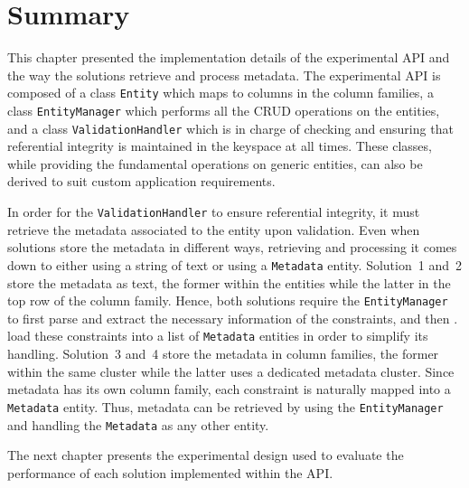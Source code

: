 

% 
% 
% 
% 
%  
% 
%   

\section{Summary}\label{s:Implementation-summary}

This chapter presented the implementation details of the experimental \ac{API}
and the way the solutions retrieve and process metadata. The experimental
\ac{API} is composed of a class \texttt{Entity} which maps to columns in the
column families, a class \texttt{EntityManager} which  performs all the
\ac{CRUD} operations on the entities, and a class \texttt{ValidationHandler}
which is in charge of checking and ensuring that referential integrity is
maintained in the keyspace at all times. These classes, while providing the fundamental
operations on generic entities, can also be derived to suit custom
application requirements. 

In order for the \texttt{ValidationHandler} to ensure referential integrity, it
must retrieve the metadata associated to the entity upon validation.  Even when
solutions store the metadata in different ways, retrieving and processing it comes down to  either using a string of text or
using a \texttt{Metadata} entity.
Solution~1 and~2 store the  metadata as text, the former  within the
entities while the latter in the top row of the column family. Hence,
both solutions require the \texttt{EntityManager} to
first parse and extract the necessary information of the constraints, and then .
load these constraints into a list of \texttt{Metadata} entities in order to
simplify its handling.
  Solution~3 and~4 store the metadata in column families, the former within the
  same cluster while the latter uses a dedicated metadata cluster. Since
  metadata has its own column family, each constraint is naturally mapped into
  a \texttt{Metadata} entity. Thus, metadata can be   retrieved by using
  the \texttt{EntityManager} and handling the \texttt{Metadata} as any other
  entity. 

The next chapter presents the experimental design used to evaluate  the
performance of each solution implemented within the \ac{API}.




